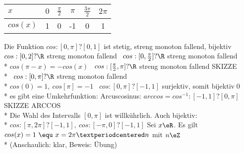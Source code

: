 \begin{tabular}{l|c|c|c|c|c}
$x$ & $0$ & $\frac{\pi}{2}$ & $\pi$ & $\frac{3\pi}{2}$ & $2\pi$\\\hline
$cos(x)$ & 1 & 0 & -1 & 0 & 1
\end{tabular}
Die Funktion $cos:[0,\pi]?[0,1]$ ist stetig, streng monoton fallend, bijektiv
\bew
$cos:[0,2]?\R$ streng monoton fallend \Rarr\ $cos:[0,\frac{\pi}{2}]?\R$ streng monoton fallend\\*
$cos(\pi-x)=-cos(x)$ \Rarr\ $cos:[\frac{\pi}{2},\pi]?\R$ streng monoton fallend SKIZZE\\*
\Rarr\ $cos:[0,\pi]?\R$ streng monoton fallend\\*
$cos(0)=1,\ cos[\pi]=-1$ \Rarr\ $cos:[0,\pi]?[-1,1]$ surjektiv, somit bijektiv\qed\\*
 es gibt eine Umkehrfunktion:
Arcuscosinus: $arccos=cos^{-1}:[-1,1]?[0,\pi]$SKIZZE ARCCOS\\*
\bem
Die Wahl des Intervalls $[0,\pi]$ ist willkührlich. Auch bijektiv:\\*
$cos:[\pi,2\pi]?[-1,1],\ cos:[-\pi,0]?[-1,1]$
\bem
Sei $x\eR$. Es gilt $cos(x)=1\ \equ\ x=2\pi·n$ mit $n\eZ$\\*
(Anschaulich: klar, Beweis: Übung)

